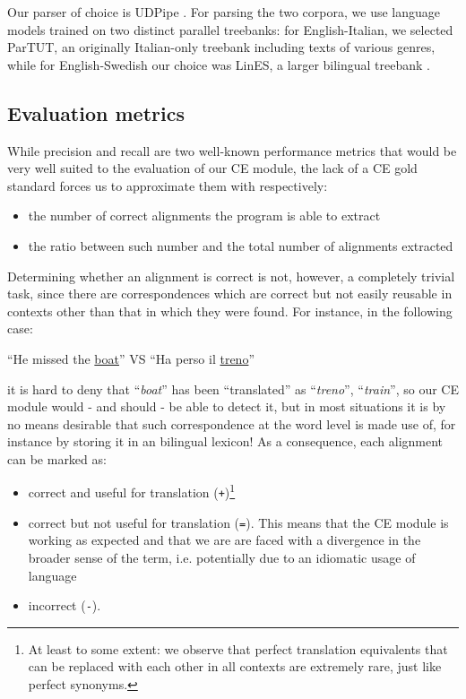 Our parser of choice is UDPipe \cite{udpipe1}. For parsing the two corpora, we use language models trained on two distinct parallel treebanks: for English-Italian, we selected ParTUT, an originally Italian-only treebank including texts of various genres, while for English-Swedish our choice was LinES, a larger bilingual treebank \cite{uddocs}.

\subsection{Evaluation metrics} \label{metrics}
While precision and recall are two well-known performance metrics that would be very well suited to the evaluation of our CE module, the lack of a CE gold standard forces us to approximate them with respectively: \smallskip

\begin{itemize}
 \item the number of correct alignments the program is able to extract
 \item the ratio between such number and the total number of alignments extracted
\end{itemize} \smallskip

Determining whether an alignment is correct is not, however, a completely trivial task, since there are correspondences which are correct but not easily reusable in contexts other than that in which they were found. For instance, in the following case: \smallskip

\begin{example} \label{extrain}
 ``He missed the \underline{boat}'' VS ``Ha perso il \underline{treno}''
\end{example} \smallskip

it is hard to deny that ``\textit{boat}'' has been ``translated'' as ``\textit{treno}'', ``\textit{train}'', so our CE module would - and should - be able to detect it, but in most situations it is by no means desirable that such correspondence at the word level is made use of, for instance by storing it in an bilingual lexicon!
As a consequence, each alignment can be marked as:
\begin{itemize}
 \item correct and useful for translation (\texttt{+})\footnote{At least to some extent: we observe that perfect translation equivalents that can be replaced with each other in all contexts are extremely rare, just like perfect synonyms.}
 \item correct but not useful for translation (\texttt{=}). This means that the CE module is working as expected and that we are are faced with a divergence in the broader sense of the term, i.e. potentially due to an idiomatic usage of language
 \item incorrect (\texttt{-}).
\end{itemize} \smallskip
 
